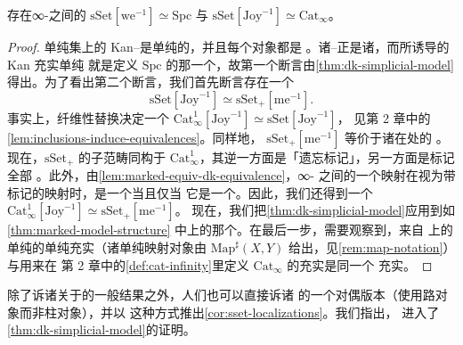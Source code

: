 \begin{corollary}\label{cor:sset-localizations}
存在∞-\trCategories{}之间的\trEquivalence{}%
$\mathrm{sSet}[\mathrm{we}^{-1}] \simeq \mathrm{Spc}$ 与
$\mathrm{sSet}[\mathrm{Joy}^{-1}] \simeq \mathrm{Cat}_\infty$。
\end{corollary}

\begin{proof}
单纯集上的 Kan--\trQuillen{}\trModelStructure{}是单纯的，并且每个对象都是%
\trCofibrant。诸\trCofibrant{}--\trFibrantObject{}正是诸\trKanComplex{}，而所诱导的 Kan 充实单纯\trCategory{}%
就是定义 $\mathrm{Spc}$ 的那一个，故第一个断言由\cref{thm:dk-simplicial-model}
得出。为了看出第二个断言，我们首先断言存在一个\trEquivalence{}%
\[
\mathrm{sSet}[\mathrm{Joy}^{-1}] \simeq \mathrm{sSet}_+[\mathrm{me}^{-1}].
\]
事实上，纤维性替换\trFunctor{}决定一个\trEquivalence{}%
$\mathrm{Cat}^1_\infty[\mathrm{Joy}^{-1}] \simeq \mathrm{sSet}[\mathrm{Joy}^{-1}]$，
见第 2 章中的\cref{lem:inclusions-induce-equivalences}。同样地，
$\mathrm{sSet}_+[\mathrm{me}^{-1}]$ 等价于诸\trFibrantObject{}在\trMarkedEquivalence{}处的%
\trLocalization{}。现在，$\mathrm{sSet}_+$ 的\trFibrantObject{}子范畴同构于
$\mathrm{Cat}^1_\infty$，其逆\trFunctor{}一方面是「遗忘标记」，另一方面是标记全部%
\trEquivalence{}。此外，由\cref{lem:marked-equiv-dk-equivalence}，∞-\trCategories{}%
之间的一个映射在视为带标记\trSimplicialSet{}的映射时，是一个\trMarkedEquivalence{}当且仅当
它是一个\trJoyalEquivalence{}。因此，我们还得到一个\trEquivalence{}%
$\mathrm{Cat}^1_\infty[\mathrm{Joy}^{-1}] \simeq \mathrm{sSet}_+[\mathrm{me}^{-1}]$。
现在，我们把\cref{thm:dk-simplicial-model}应用到如\cref{thm:marked-model-structure}
中\trMarkedSimplicialSet{}上的那个\trModelStructure{}。在最后一步，需要观察到，来自%
\trMarkedSimplicialSet{}上的单纯\trModelStructure{}的单纯充实（诸单纯映射对象由
$\mathrm{Map}^\sharp(X, Y)$ 给出，见\cref{rem:map-notation}）与用来在
第 2 章中的\cref{def:cat-infinity}里定义 $\mathrm{Cat}_\infty$ 的充实是同一个
充实。
\end{proof}

\begin{remark}\label{rem:dual-lur17}
除了诉诸关于\trSimplicialModelCategory{}的一般结果之外，人们也可以直接诉诸
\cite[Proposition 1.3.4.7]{Lur17} 的一个对偶版本（使用路对象而非柱对象），并以
这种方式推出\cref{cor:sset-localizations}。我们指出，\cite[Proposition
1.3.4.7]{Lur17} 进入了\cref{thm:dk-simplicial-model}的证明。
\end{remark}
